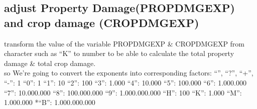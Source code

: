 \documentclass[
]{article}
\begin{document}
\hypertarget{adjust-property-damagepropdmgexp-and-crop-damage-cropdmgexp}{%
\subsection{adjust Property Damage(PROPDMGEXP) and crop damage
(CROPDMGEXP)}\label{adjust-property-damagepropdmgexp-and-crop-damage-cropdmgexp}}

transform the value of the variable PROPDMGEXP \& CROPDMGEXP from
character such as ``K'' to number to be able to calculate the total
property damage \& total crop damage.\\
so We're going to convert the exponents into corresponding factors:
``'', ``?'', ``+'', ``-'': 1 ``0'': 1 ``1'': 10 ``2'': 100 ``3'': 1.000
``4'': 10.000 ``5'': 100.000 ``6'': 1.000.000 ``7'': 10.000.000 ``8'':
100.000.000 ``9'': 1.000.000.000 ``H'': 100 ``K'': 1.000 ``M'':
1.000.000 *``B'': 1.000.000.000
\end{document}
